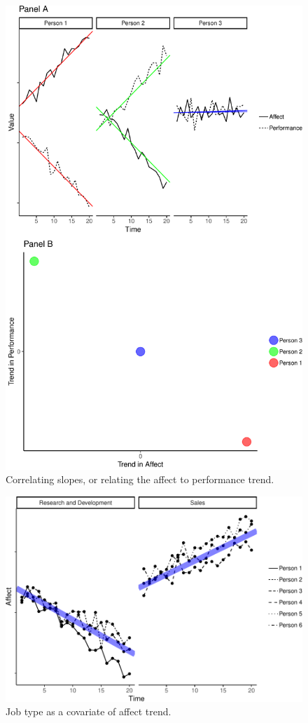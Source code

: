 \documentclass[english,,man]{apa6}
\theoremstyle{definition}
\theoremstyle{definition}
\theoremstyle{definition}
\theoremstyle{remark}
\begin{document}
\begin{figure}
\centering
\includegraphics{figures/unnamed-chunk-10-1.pdf}
\caption{\label{fig:unnamed-chunk-10}Correlating slopes, or relating the
affect to performance trend.\label{trend_correlation}}
\end{figure}

\begin{figure}
\centering
\includegraphics{figures/unnamed-chunk-11-1.pdf}
\caption{\label{fig:unnamed-chunk-11}Job type as a covariate of affect
trend.\label{trend_covariate}}
\end{figure}
\end{document}
